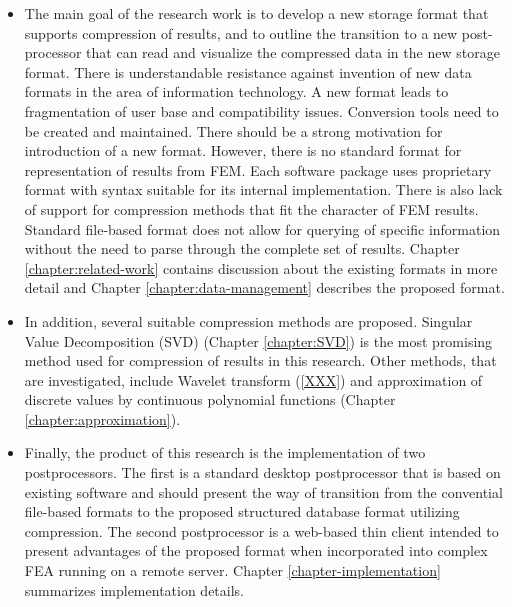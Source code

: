 \begin{itemize}
    \item The main goal of the research work is to develop a new storage format that supports compression of results, and to outline the transition to a new post-processor that can read and visualize the compressed data in the new storage format. There is understandable resistance against invention of new data formats in the area of information technology. A new format leads to fragmentation of user base and compatibility issues. Conversion tools need to be created and maintained. There should be a strong motivation for introduction of a new format. However, there is no standard format for representation of results from FEM. Each software package uses proprietary format with syntax suitable for its internal implementation. There is also lack of support for compression methods that fit the character of FEM results. Standard file-based format does not allow for querying of specific information without the need to parse through the complete set of results. Chapter \ref{chapter:related-work} contains discussion about the existing formats in more detail and Chapter \ref{chapter:data-management} describes the proposed format.
    \item In addition, several suitable compression methods are proposed. Singular Value Decomposition (SVD) (Chapter \ref{chapter:SVD}) is the most promising method used for compression of results in this research. Other methods, that are investigated, include Wavelet transform (\ref{XXX}) and approximation of discrete values by continuous polynomial functions (Chapter \ref{chapter:approximation}).
    \item Finally, the product of this research is the implementation of two postprocessors. The first is a standard desktop postprocessor that is based on existing software and should present the way of transition from the convential file-based formats to the proposed structured database format utilizing compression. The second postprocessor is a web-based thin client intended to present advantages of the proposed format when incorporated into complex FEA running on a remote server. Chapter \ref{chapter-implementation} summarizes implementation details.
\end{itemize}


